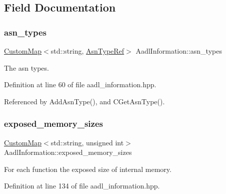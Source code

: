 \subsection{Field Documentation}
\mbox{\label{classAadlInformation_a500ce2a56c9bc2c65d18255e18b0844b}} 
\subsubsection{\texorpdfstring{asn\+\_\+types}{asn\_types}}
{\footnotesize\ttfamily \hyperlink{custom__map_8hpp_a18ca01763abbe3e5623223bfe5aaac6b}{Custom\+Map}$<$std\+::string, \hyperlink{asn__type_8hpp_a456d7cf50c15d087cc0428ae80834b35}{Asn\+Type\+Ref}$>$ Aadl\+Information\+::asn\+\_\+types\hspace{0.3cm}{\ttfamily [protected]}}



The asn types. 



Definition at line 60 of file aadl\+\_\+information.\+hpp.



Referenced by Add\+Asn\+Type(), and C\+Get\+Asn\+Type().

\mbox{\label{classAadlInformation_a94c5f5e4fe218bdb0ecb821a840246fd}} 
\subsubsection{\texorpdfstring{exposed\+\_\+memory\+\_\+sizes}{exposed\_memory\_sizes}}
{\footnotesize\ttfamily \hyperlink{custom__map_8hpp_a18ca01763abbe3e5623223bfe5aaac6b}{Custom\+Map}$<$std\+::string, unsigned int$>$ Aadl\+Information\+::exposed\+\_\+memory\+\_\+sizes}



For each function the exposed size of internal memory. 



Definition at line 134 of file aadl\+\_\+information.\+hpp.

\mbox{\label{classAadlInformation_a3fd7b442c01a24407e5d51f2a1dc10f0}} 
